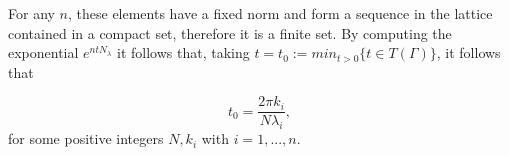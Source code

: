 \documentclass[11pt]{amsart}
\theoremstyle{plain}
\theoremstyle{definition}
\theoremstyle{remark}
\begin{document}
For any $n$, these elements have a fixed norm and form a sequence in the lattice contained in a compact set, therefore it is a finite set. By computing the exponential $e^{n t N_\lambda}$ it follows that, taking $t=t_0 := min_{t>0} \{ t \in T(\Gamma) \} $, it follows that 

\begin{equation} \label{oscilator-N}
t_0=\frac{2 \pi k_i}{N \lambda_i},
\end{equation}
for some positive integers $N, k_i$ with $i=1, ..., n$.








\end{document}
